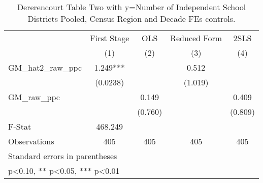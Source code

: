 \begin{table}[htbp]\centering
\def\sym#1{\ifmmode^{#1}\else\(^{#1}\)\fi}
\caption{Dererencourt Table Two with y=Number of Independent School Districts  Pooled, Census Region and Decade FEs controls.}
\begin{tabular}{l*{4}{c}}
\toprule
                    & First Stage   &         OLS   &Reduced Form   &        2SLS   \\
                    &\multicolumn{1}{c}{(1)}   &\multicolumn{1}{c}{(2)}   &\multicolumn{1}{c}{(3)}   &\multicolumn{1}{c}{(4)}   \\
\midrule
GM\_hat2\_raw\_ppc     &       1.249***&               &       0.512   &               \\
                    &    (0.0238)   &               &     (1.019)   &               \\
\addlinespace
GM\_raw\_ppc          &               &       0.149   &               &       0.409   \\
                    &               &     (0.760)   &               &     (0.809)   \\
\midrule
F-Stat              &     468.249   &               &               &               \\
Observations        &         405   &         405   &         405   &         405   \\
\bottomrule
\multicolumn{5}{l}{\footnotesize Standard errors in parentheses}\\
\multicolumn{5}{l}{\footnotesize * p<0.10, ** p<0.05, *** p<0.01}\\
\end{tabular}
\end{table}
